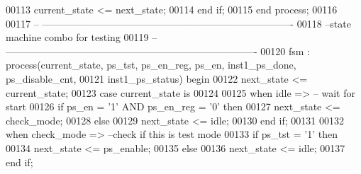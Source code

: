 \begin{DoxyCode}
00113       \textcolor{vhdlchar}{current_state} \textcolor{vhdlchar}{<=} \textcolor{vhdlchar}{next_state};
00114    \textcolor{keywordflow}{end} \textcolor{keywordflow}{if};  
00115 \textcolor{keywordflow}{end} \textcolor{keywordflow}{process};
00116 
00117 \textcolor{keyword}{-- ----------------------------------------------------------------------------}
00118 \textcolor{keyword}{--state machine combo for testing}
00119 \textcolor{keyword}{-- ----------------------------------------------------------------------------}
00120 fsm : \textcolor{keywordflow}{process}(current_state, ps_tst, ps_en_reg, ps_en, inst1_ps_done, 
      ps_disable_cnt,
00121                inst1_ps_status) \textcolor{keywordflow}{begin}
00122    \textcolor{vhdlchar}{next_state} \textcolor{vhdlchar}{<=} \textcolor{vhdlchar}{current_state};
00123    \textcolor{keywordflow}{case} \textcolor{vhdlchar}{current_state} \textcolor{keywordflow}{is}
00124    
00125       \textcolor{keywordflow}{when} \textcolor{vhdlchar}{idle} \textcolor{vhdlchar}{=}\textcolor{vhdlchar}{>}\textcolor{keyword}{                     -- wait for start}
00126          \textcolor{keywordflow}{if} \textcolor{vhdlchar}{ps_en} \textcolor{vhdlchar}{=} \textcolor{vhdlchar}{'}\textcolor{vhdllogic}{}\textcolor{vhdllogic}{1}\textcolor{vhdlchar}{'} \textcolor{keywordflow}{AND} \textcolor{vhdlchar}{ps_en_reg} \textcolor{vhdlchar}{=} \textcolor{vhdlchar}{'}\textcolor{vhdllogic}{}\textcolor{vhdllogic}{0}\textcolor{vhdlchar}{'} \textcolor{keywordflow}{then} 
00127             \textcolor{vhdlchar}{next_state} \textcolor{vhdlchar}{<=} \textcolor{vhdlchar}{check\_mode};
00128          \textcolor{keywordflow}{else} 
00129             \textcolor{vhdlchar}{next_state} \textcolor{vhdlchar}{<=} \textcolor{vhdlchar}{idle};
00130          \textcolor{keywordflow}{end} \textcolor{keywordflow}{if};
00131          
00132       \textcolor{keywordflow}{when} \textcolor{vhdlchar}{check\_mode} \textcolor{vhdlchar}{=}\textcolor{vhdlchar}{>}\textcolor{keyword}{               --check if this is test mode}
00133          \textcolor{keywordflow}{if} \textcolor{vhdlchar}{ps_tst} \textcolor{vhdlchar}{=} \textcolor{vhdlchar}{'}\textcolor{vhdllogic}{}\textcolor{vhdllogic}{1}\textcolor{vhdlchar}{'} \textcolor{keywordflow}{then} 
00134             \textcolor{vhdlchar}{next_state} \textcolor{vhdlchar}{<=} \textcolor{vhdlchar}{ps\_enable};
00135          \textcolor{keywordflow}{else} 
00136             \textcolor{vhdlchar}{next_state} \textcolor{vhdlchar}{<=} \textcolor{vhdlchar}{idle};
00137          \textcolor{keywordflow}{end} \textcolor{keywordflow}{if};

\end{DoxyCode}
